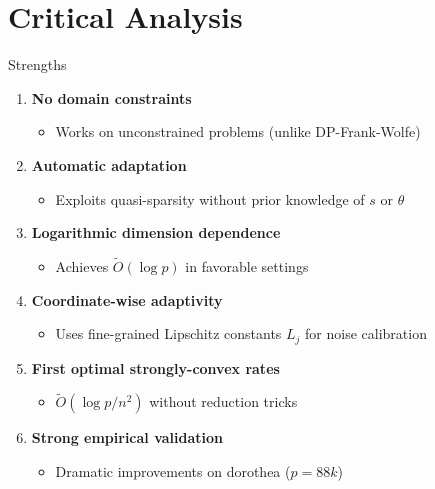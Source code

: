 \documentclass[10pt]{beamer}
\begin{document}
\section{Critical Analysis}

\begin{frame}{Strengths}
\begin{enumerate}
\item \textbf{No domain constraints}
\begin{itemize}
\item Works on unconstrained problems (unlike DP-Frank-Wolfe)
\end{itemize}

\item \textbf{Automatic adaptation}
\begin{itemize}
\item Exploits quasi-sparsity without prior knowledge of $s$ or $\theta$
\end{itemize}

\item \textbf{Logarithmic dimension dependence}
\begin{itemize}
\item Achieves $\tilde{O}(\log p)$ in favorable settings
\end{itemize}

\item \textbf{Coordinate-wise adaptivity}
\begin{itemize}
\item Uses fine-grained Lipschitz constants $L_j$ for noise calibration
\end{itemize}

\item \textbf{First optimal strongly-convex rates}
\begin{itemize}
\item $\tilde{O}(\log p / n^2)$ without reduction tricks
\end{itemize}

\item \textbf{Strong empirical validation}
\begin{itemize}
\item Dramatic improvements on dorothea ($p = 88k$)
\end{itemize}
\end{enumerate}
\end{frame}
\end{document}

